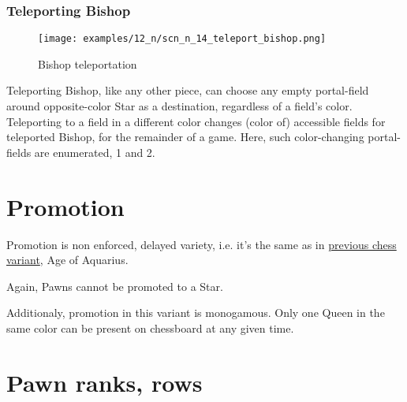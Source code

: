 \clearpage %

\subsubsection*{Teleporting Bishop}

\vspace*{-1.1\baselineskip}
\noindent
\begin{figure}[!h]
\texttt{[image: examples/12\_n/scn\_n\_14\_teleport\_bishop.png]}
\caption{Bishop teleportation}
\label{fig:scn_n_14_teleport_bishop}
\end{figure}

Teleporting Bishop, like any other piece, can choose any empty portal-field
around opposite-color Star as a destination, regardless of a field's color.
Teleporting to a field in a different color changes (color of) accessible
fields for teleported Bishop, for the remainder of a game. Here, such
color-changing portal-fields are enumerated, 1 and 2.

\clearpage %

\section*{Promotion}

Promotion is non enforced, delayed variety, i.e. it's the same as in
\hyperref[sec:Age of Aquarius/Promotion]{previous chess variant}, Age of Aquarius.

Again, Pawns cannot be promoted to a Star.

Additionaly, promotion in this variant is monogamous.
Only one Queen in the same color can be present on chessboard at any given time.

\clearpage %

\section*{Pawn ranks, rows}

